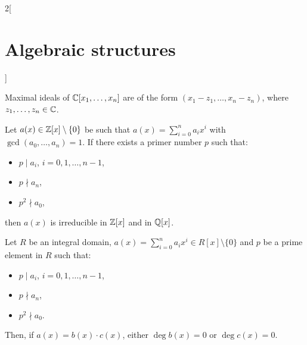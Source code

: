 \documentclass[../../../main.tex]{subfiles}
\begin{document}
\begin{multicols}{2}[\section{Algebraic structures}]
\begin{theorem}
    \end{theorem}
    \begin{theorem}
        Maximal ideals of $\mathbb{C}[x_1,\ldots,x_n]$ are of the form $(x_1-z_1,\ldots,x_n-z_n)$, where $z_1,\ldots,z_n\in\mathbb{C}$.
    \end{theorem}
    \begin{theorem}
        Let $a(x)\in\mathbb{Z}[x]\setminus\{0\}$ be such that $a(x)=\sum_{i=0}^na_ix^i$ with $\gcd(a_0,\ldots,a_n)=1$. If there exists a primer number $p$ such that:
        \begin{itemize}
            \item $p\mid a_i$, $i=0,1,\ldots,n-1$,
            \item $p\nmid a_n$,
            \item $p^2\nmid a_0$,
        \end{itemize}
        then $a(x)$ is irreducible in $\mathbb{Z}[x]$ and in $\mathbb{Q}[x]$.
    \end{theorem}
    \begin{theorem}
        Let $R$ be an integral domain, $a(x)=\sum_{i=0}^na_ix^i\in R[x]\setminus\{0\}$ and $p$ be a prime element in $R$ such that:
        \begin{itemize}
            \item $p\mid a_i$, $i=0,1,\ldots,n-1$,
            \item $p\nmid a_n$,
            \item $p^2\nmid a_0$.
        \end{itemize}
        Then, if $a(x)=b(x)\cdot c(x)$, either $\deg b(x)=0$ or $\deg c(x)=0$.
    \end{theorem}

\end{multicols}
\end{document}
